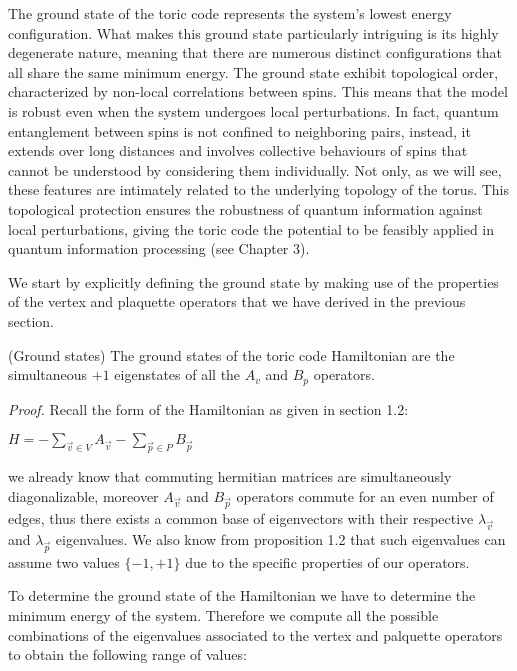 \documentclass{Configuration_Files/PoliMi3i_thesis}
\begin{document}
The ground state of the toric code represents the system's lowest energy configuration. What makes this ground state particularly intriguing is its highly degenerate nature, meaning that there are numerous distinct configurations that all share the same minimum energy. 
The ground state exhibit topological order, characterized by non-local correlations between spins. This means that the model is robust  even when the system undergoes local perturbations.  In fact, quantum entanglement between spins is not confined to neighboring pairs, instead, it extends over long distances and involves collective behaviours of spins that cannot be understood by considering them individually.
Not only, as we will see, these features are intimately related to the underlying topology of the torus. This topological protection ensures the robustness of quantum information against local perturbations, giving the toric code the potential to be feasibly applied in quantum information processing (see Chapter 3).\newline

We start by explicitly defining the ground state by making use of the properties of the vertex and plaquette operators that we have derived in the previous section.

\begin{proposition} (Ground states) The ground states of the toric code Hamiltonian are the simultaneous $+1$ eigenstates of all the $A_v$ and $B_p$ operators. 
\end{proposition}

\textit{Proof.}\newline 
Recall the form of the Hamiltonian as given in section 1.2:

\begin{center}
	
	$H = -\sum_{\vec{v} \in V}
	A_{\vec{v}} - \sum_{\vec{p} \in P} B_{\vec{p}} $
	
\end{center}

we already know that commuting hermitian matrices are simultaneously diagonalizable, moreover $A_{\vec{v}} $ and $B_{\vec{p}} $ operators commute for an even number of edges, thus there exists a common base of eigenvectors with their respective $\lambda_{\vec{v}}$ and $\lambda_{\vec{p}}$ eigenvalues. We also know from proposition 1.2 that such eigenvalues can assume two values $\{-1,+1\}$ due to the specific properties of our operators.

To determine the ground state of the Hamiltonian we have to determine the minimum energy of the system. Therefore we compute all the possible combinations of the eigenvalues associated to the vertex and palquette operators to obtain the following range of values:
\end{document}
